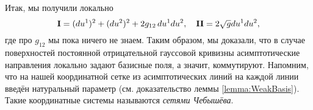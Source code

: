 Итак, мы получили локально
\[
	\boldsymbol{\operatorname{I}} = (du^1)^2 + (du^2)^2 + 2g_{12}\,du^1du^2,\quad \boldsymbol{\operatorname{II}} = 2\sqrt{g}du^1du^2,
\]
где про $g_{12}$ мы пока ничего не знаем. Таким образом, мы доказали, что в случае поверхностей постоянной отрицательной гауссовой кривизны асимптотические направления локально задают базисные поля, а значит, коммутируют. Напомним, что на нашей координатной сетке из асимптотических линий на каждой линии введён натуральный параметр (см. доказательство леммы \ref{lemma:WeakBasis}). Такие координатные системы называются \textit{сетями Чебышёва}\footnotemark.


